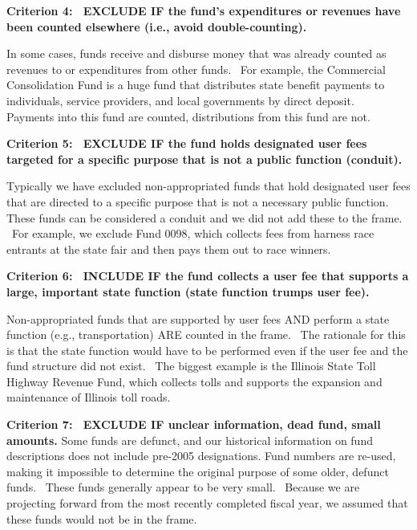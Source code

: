 \documentclass[
  letterpaper,
  DIV=11,
  numbers=noendperiod]{scrreport}
\begin{document}
\textbf{Criterion 4:~ EXCLUDE IF the fund's expenditures or revenues
have been counted elsewhere (i.e., avoid double-counting).}

In some cases, funds receive and disburse money that was already counted
as revenues to or expenditures from other funds.~ For example, the
Commercial Consolidation Fund is a huge fund that distributes state
benefit payments to individuals, service providers, and local
governments by direct deposit.~ Payments into this fund are counted,
distributions from this fund are not.~

\textbf{Criterion 5:~ EXCLUDE IF the fund holds designated user fees
targeted for a specific purpose that is not a public function
(conduit).}

Typically we have excluded non-appropriated funds that hold designated
user fees that are directed to a specific purpose that is not a
necessary public function.~ These funds can be considered a conduit and
we did not add these to the frame. ~For example, we exclude Fund 0098,
which collects fees from harness race entrants at the state fair and
then pays them out to race winners.

\textbf{Criterion 6:~ INCLUDE IF the fund collects a user fee that
supports a large, important state function (state function trumps user
fee).}

Non-appropriated funds that are supported by user fees AND perform a
state function (e.g., transportation) ARE counted in the frame.~ The
rationale for this is that the state function would have to be performed
even if the user fee and the fund structure did not exist.~ The biggest
example is the Illinois State Toll Highway Revenue Fund, which collects
tolls and supports the expansion and maintenance of Illinois toll
roads.~

\textbf{Criterion 7:~ EXCLUDE IF unclear information, dead fund, small
amounts.} Some funds are defunct, and our historical information on fund
descriptions does not include pre-2005 designations. Fund numbers are
re-used, making it impossible to determine the original purpose of some
older, defunct funds.~ These funds generally appear to be very small.~
Because we are projecting forward from the most recently completed
fiscal year, we assumed that these funds would not be in the frame.~

\hypertarget{section}{%
\section*{}\label{section}}
\end{document}
